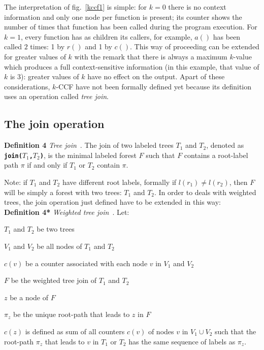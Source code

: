 \documentclass[a4paper,11pt]{report}
\begin{document}
The interpretation of fig.~\ref{kccf1} is simple: for $k=0$ there is no context
information and only one node per function is present; its counter shows the number of times that function has been called during the program execution. For $k=1$, every function has as children its callers, for example, $a()$ has been called $2$ times: 1 by $r()$ and 1 by $c()$. This way of proceeding can be extended for greater values of $k$ with the remark that 
there is always a maximum $k$-value which produces a full context-sensitive information 
(in this example, that value of $k$ is $3$): greater values of $k$ have no effect on the output. Apart of these considerations, $k$-CCF have not been formally defined yet because its definition uses an operation called \emph{tree join}.

\subsection{The join operation}

\textbf{Definition 4} \emph{Tree join}~\cite{kccf}. 
The join of two labeled trees $T_1$ and $T_2$, denoted as 
\texttt{\textbf{join(}}$T_1$\texttt{\textbf{,}}$T_2$\texttt{\textbf{)}}, 
is the minimal labeled forest $F$ such that $F$ contains a root-label path $\pi$ if and 
only if $T_1$ or $T_2$ contain $\pi$.

Note: if $T_1$ and $T_2$ have different root labels, 
formally if $l(r_1)\ne l(r_2)$, then $F$ will be simply a forest with two trees: $T_1$ and $T_2$. In order to deals with weighted trees, the join operation just defined have to be extended in this way: \\
\textbf{Definition 4*} \emph{Weighted tree join}~\cite{kccf}.
Let: 

\renewcommand{\labelitemi}{$-$}

\begin{itemize*}
\item $T_1$ and $T_2$ be two trees
\item $V_1$ and $V_2$ be all nodes of $T_1$ and $T_2$
\item $c(v)$ be a counter associated with each node $v$ in $V_1$ and $V_2$
\item $F$ be the weighted tree join of $T_1$ and $T_2$
\item $z$ be a node of $F$
\item $\pi_z$ be the unique root-path that leads to $z$ in $F$
\end{itemize*}
\renewcommand{\labelitemi}{$\bullet$}
$c(z)$ is defined as sum of all counters $c(v)$ of nodes $v$ in $V_1 \cup V_2$ such
that the root-path $\pi_z$ that leads to $v$ in $T_1$ or $T_2$ has the same sequence of 
labels as $\pi_z$.
\end{document}
